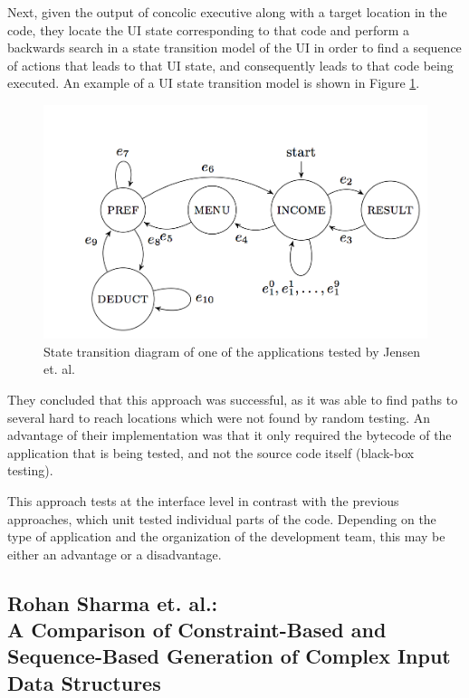 \documentclass{sig-alternate-05-2015}
\begin{document}
Next, given the output of concolic executive along with a target location in
the code, they locate the UI state corresponding to that code and perform a
backwards search in a state transition model of the UI in order to find a
sequence of actions that leads to that UI state, and consequently leads to that
code being executed. An example of a UI state transition model is shown in
Figure \ref{ui}.

\begin{figure}
\center
\includegraphics[scale=0.25]{ui.png}
\caption{State transition diagram of one of the applications tested by Jensen
         et. al.}
\label{ui}
\end{figure}

They concluded that this approach was successful, as it was able to find paths
to several hard to reach locations which were not found by random testing. An
advantage of their implementation was that it only required the bytecode of the
application that is being tested, and not the source code itself (black-box
testing).

This approach tests at the interface level in contrast with the previous
approaches, which unit tested individual parts of the code. Depending on the
type of application and the organization of the development team, this may be
either an advantage or a disadvantage.

\subsection{Rohan Sharma et. al.: \\A Comparison of Constraint-Based and
            \\Sequence-Based Generation of Complex Input Data Structures}
\end{document}
